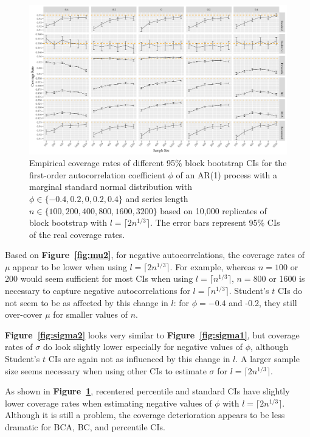 \documentclass[10pt]{article}
\begin{document}
\begin{figure}[tbp]
  \centering
  \includegraphics[width=\textwidth]{figures/plot_norm_phi_2}
  \caption{Empirical coverage rates of different 95\% block bootstrap CIs for 
    the first-order autocorrelation coefficient $\phi$ of an AR(1) process with 
    a marginal standard normal distribution with 
    $\phi \in \{-0.4, 0.2, 0, 0.2, 0.4\}$ and series length
    $n \in \{100, 200, 400, 800, 1600, 3200\}$ based on 10,000 replicates of
    block bootstrap with $l = \lceil 2n^{1/3} \rceil$. The
    error bars represent 95\% CIs of the real coverage rates.}
  \label{fig:phi2}
\end{figure}

Based on \textbf{Figure~\ref{fig:mu2}}, for negative autocorrelations, the 
coverage 
rates of $\mu$ appear to be lower when
using $l = \lceil 2n^{1/3} \rceil$. For example, whereas $n = 100$ or 200 
would seem sufficient for most CIs when using $l = \lceil n^{1/3} \rceil$, 
$n = 800$ or 1600 is necessary to capture negative autocorrelations for 
$l = \lceil n^{1/3} \rceil$. Student's $t$ CIs do not seem to be as affected
by this change in $l$: for $\phi = -0.4$ and -0.2, they still over-cover $\mu$
for smaller values of $n$. 

\textbf{Figure~\ref{fig:sigma2}} looks very similar to 
\textbf{Figure~\ref{fig:sigma1}}, but coverage rates of $\sigma$ do look 
slightly lower
especially for negative values of $\phi$, although Student's $t$ CIs are again
not as influenced by this change in $l$. A larger sample size seems necessary
when using other CIs to estimate $\sigma$ for $l = \lceil 2n^{1/3} \rceil$.

As shown in \textbf{Figure~\ref{fig:phi2}},
recentered percentile and standard CIs have slightly lower coverage rates when
estimating negative values of $\phi$ with $l = \lceil 2n^{1/3} \rceil$. 
Although it is still a problem, the coverage deterioration appears to be less 
dramatic for BCA,
BC, and percentile CIs.
\end{document}
